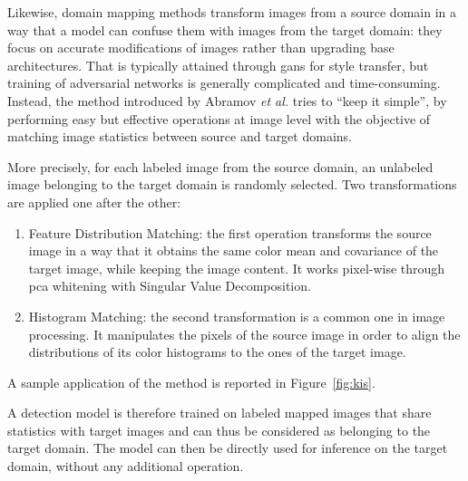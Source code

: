 \documentclass[%
    corpo=12pt,
    twoside,
    stile=classica,   
    tipotesi=magistrale,
    evenboxes,
    english,
	numerazioneromana,
]{toptesi}
\newcommand{\quotes}[1]{``#1''}
\begin{document}
\bigskip
Likewise, domain mapping methods transform images from a source domain in a way that a model can confuse them with images from the target domain: they focus on accurate modifications of images rather than upgrading base architectures. That is typically attained through \glspl{gan} for style transfer, but training of adversarial networks is generally complicated and time-consuming. Instead, the method introduced by Abramov \textit{et al.}\cite{abramov2020simple} tries to \quotes{keep it simple}, by performing easy but effective operations at image level with the objective of matching image statistics between source and target domains.

More precisely, for each labeled image from the source domain, an unlabeled image belonging to the target domain is randomly selected. Two transformations are applied one after the other:
\begin{enumerate}
	\item Feature Distribution Matching: the first operation transforms the source image in a way that it obtains the same color mean and covariance of the target image, while keeping the image content. It works pixel-wise through \gls{pca} whitening with Singular Value Decomposition.
	\item Histogram Matching: the second transformation is a common one in image processing. It manipulates the pixels of the source image in order to align the distributions of its color histograms to the ones of the target image.
\end{enumerate}
A sample application of the method is reported in Figure~\ref{fig:kis}.

A detection model is therefore trained on labeled mapped images that share statistics with target images and can thus be considered as belonging to the target domain. The model can then be directly used for inference on the target domain, without any additional operation.
\end{document}
